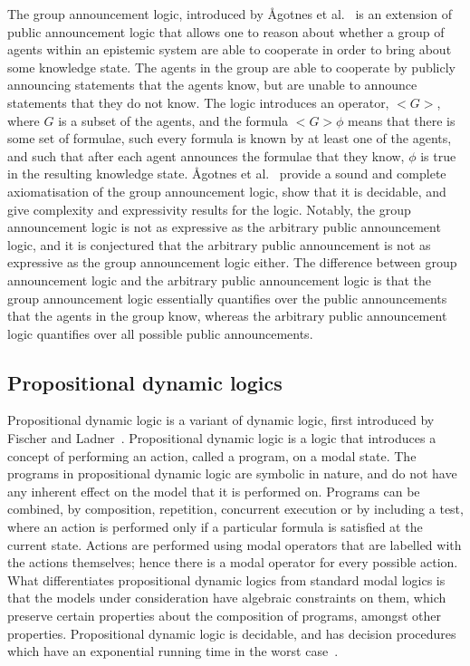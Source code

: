 The group announcement logic, introduced by {\AA}gotnes et
al.~\cite{agotnes2010group} is an extension of public announcement logic that
allows one to reason about whether a group of agents within an epistemic system
are able to cooperate in order to bring about some knowledge state. The agents
in the group are able to cooperate by publicly announcing statements that the
agents know, but are unable to announce statements that they do not know. The
logic introduces an operator, $<G>$, where $G$ is a subset of the agents, and
the formula $<G> \phi$ means that there is some set of formulae, such every
formula is known by at least one of the agents, and such that after each agent
announces the formulae that they know, $\phi$ is true in the resulting
knowledge state. {\AA}gotnes et al.~\cite{agotnes2010group} provide a sound and
complete axiomatisation of the group announcement logic, show that it is
decidable, and give complexity and expressivity results for the logic. Notably,
the group announcement logic is not as expressive as the arbitrary public
announcement logic, and it is conjectured that the arbitrary public
announcement is not as expressive as the group announcement logic either.  The
difference between group announcement logic and the arbitrary public
announcement logic is that the group announcement logic essentially quantifies
over the public announcements that the agents in the group know, whereas the
arbitrary public announcement logic quantifies over all possible public
announcements.

\subsection{Propositional dynamic logics}

Propositional dynamic logic is a variant of dynamic logic, first introduced by
Fischer and Ladner~\cite{fischer1979propositional}. Propositional dynamic logic
is a logic that introduces a concept of performing an action, called a program,
on a modal state. The programs in propositional dynamic logic are symbolic in
nature, and do not have any inherent effect on the model that it is performed
on. Programs can be combined, by composition, repetition, concurrent execution
or by including a test, where an action is performed only if a particular
formula is satisfied at the current state. Actions are performed using modal
operators that are labelled with the actions themselves; hence there is a modal
operator for every possible action. What differentiates propositional dynamic
logics from standard modal logics is that the models under consideration have
algebraic constraints on them, which preserve certain properties about the
composition of programs, amongst other properties. Propositional dynamic logic
is decidable, and has decision procedures which have an exponential running time
in the worst case~\cite{pratt1980near}.

